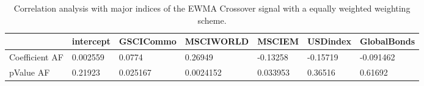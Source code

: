 \begin{table}[H]
\centering
\begin{tabular}{lllllll}
& intercept & GSCICommo & MSCIWORLD & MSCIEM & USDindex & GlobalBonds \\ 
\hline 
Coefficient AF & 0.002559 & 0.0774 & 0.26949 & -0.13258 & -0.15719 & -0.091462 \\ 
pValue AF & 0.21923 & 0.025167 & 0.0024152 & 0.033953 & 0.36516 & 0.61692 \\ 
\hline
\end{tabular}
\caption{Correlation analysis with major indices of the EWMA Crossover signal with a equally weighted weighting scheme.}
\label{MBBSEW_AFACTOR}
\end{table}